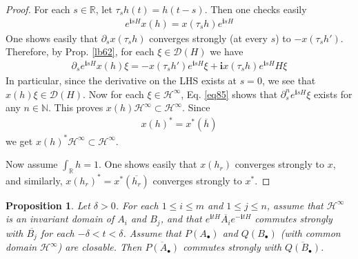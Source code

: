\documentclass[12pt,b5paper,notitlepage]{article}
\theoremstyle{definition}
\theoremstyle{plain}
\newtheorem{pp}[df]{Proposition}
\newcommand{\mc}{\mathcal}
\newcommand{\ovl}{\overline}
\newcommand{\Dom}{\scr{D}}
\newcommand{\scr}{\mathscr}
\newcommand{\im}{\mathbf{i}}
\newcommand{\blt}{\bullet}
\newcommand{\Nbb}{\mathbb N}
\newcommand{\Rbb}{\mathbb R}
\numberwithin{equation}{section}
\begin{document}
\begin{proof}
For each $s\in\Rbb$, let $\tau_sh(t)=h(t-s)$. Then one checks easily
\begin{align}
e^{\im sH}x(h)=x(\tau_sh)e^{\im sH}
\end{align} 
One shows easily that $\partial_s x(\tau_sh)$ converges strongly (at every $s$) to $-x(\tau_sh')$. Therefore, by Prop. \ref{lb62}, for each $\xi\in\Dom(H)$ we have
\begin{align}\label{eq85}
\partial_se^{\im sH}x(h)\xi=-x(\tau_sh')e^{\im sH}\xi+\im x(\tau_sh)e^{\im sH}H\xi
\end{align}
In particular, since the derivative on the LHS exists at $s=0$, we see that $x(h)\xi\in\Dom(H)$. Now for each $\xi\in\mc H^\infty$, Eq. \eqref{eq85} shows that $\partial_s^ne^{\im sH}\xi$ exists for any $n\in\Nbb$. This proves $x(h)\mc H^\infty\subset\mc H^\infty$. Since
\begin{align*}
x(h)^*=x^*(\ovl h)
\end{align*}
we get $x(h)^*\mc H^\infty\subset\mc H^\infty$.

Now assume $\int_\Rbb h=1$. One shows easily that $x(h_r)$ converges strongly to $x$, and similarly, $x(h_r)^*=x^*(\ovl{h_r})$ converges strongly to $x^*$.
\end{proof}



\begin{pp}\label{lb68}
Let $\delta>0$. For each $1\leq i\leq m$ and $1\leq j\leq n$, assume that $\mc H^\infty$ is an invariant domain of $A_i$ and $B_j$, and that $e^{\im tH}\ovl{A_i}e^{-\im tH}$ commutes strongly with $\ovl{B_j}$ for each $-\delta<t<\delta$. Assume that $P(A_\blt)$ and $Q(B_\blt)$ (with common domain $\mc H^\infty$) are closable. Then $\ovl{P(A_\blt)}$ commutes strongly with $\ovl{Q(B_\blt)}$. 
\end{pp}
\end{document}
